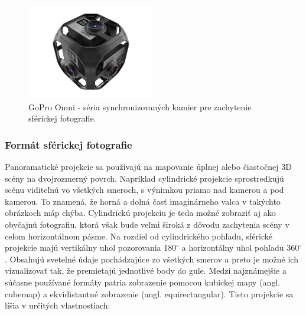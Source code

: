 \documentclass[slovak,master,dept460,male,cpp,cpdeclaration]{diploma}
\begin{document}
\begin{figure}[H]
	\centering
	\includegraphics[width=0.5\textwidth]{Figures/goproOmni.jpg}
	\caption{GoPro Omni - séria synchronizovaných kamier pre zachytenie sférickej fotografie.\cite{goproOmni}}
	\label{fig:goproOmni}
\end{figure}


\subsubsection*{Formát sférickej fotografie}
Panoramatické projekcie sa používajú na mapovanie úplnej alebo čiastočnej 3D scény na dvojrozmerný povrch. Napríklad cylindrické projekcie sprostredkujú scénu viditeľnú vo všetkých smeroch, s výnimkou priamo nad kamerou a pod kamerou. To znamená, že horná a dolná časť imaginárneho valca v takýchto obrázkoch máp chýba. Cylindrickú projekciu je teda možné zobraziť aj ako obyčajnú fotografiu, ktorá však bude veľmi  široká z dôvodu zachytenia scény v celom horizontálnom pásme.
Na rozdiel od cylindrického pohľadu, sférické projekcie majú vertikálny uhol pozorovania 180$ ^\circ$ a horizontálny uhol pohľadu 360$ ^\circ$. Obsahujú svetelné údaje pochádzajúce zo všetkých smerov a preto je možné ich vizualizovať tak, že premietajú jednotlivé body do gule. Medzi najznámejšie  a súčasne používané formáty patria zobrazenie pomocou kubickej mapy (angl. cubemap) a ekvidistantné zobrazenie (angl. equirectangular). Tieto projekcie  sa líšia v určitých vlastnostiach:
\end{document}
